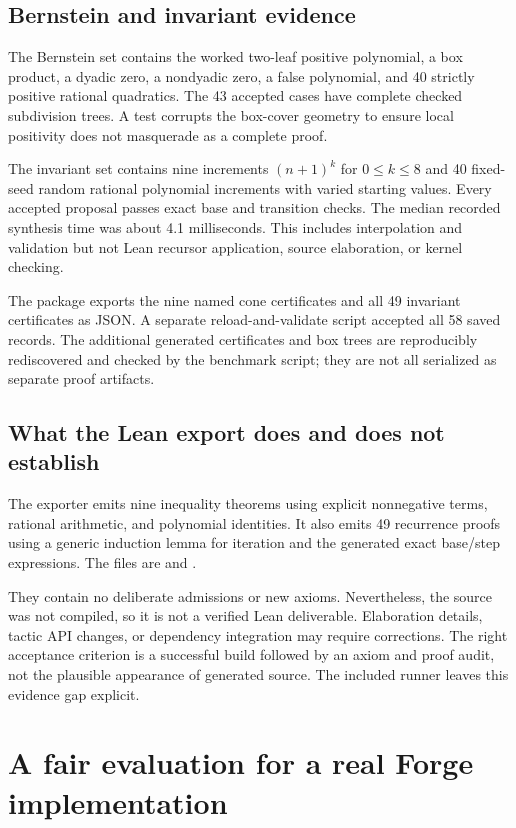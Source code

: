 \documentclass[11pt,a4paper]{article}
\begin{document}
\subsection{Bernstein and invariant evidence}

The Bernstein set contains the worked two-leaf positive polynomial, a box
product, a dyadic zero, a nondyadic zero, a false polynomial, and 40 strictly
positive rational quadratics. The 43 accepted cases have complete checked
subdivision trees. A test corrupts the box-cover geometry to ensure local
positivity does not masquerade as a complete proof.

The invariant set contains nine increments $(n+1)^k$ for $0\leq k\leq8$ and
40 fixed-seed random rational polynomial increments with varied starting
values. Every accepted proposal passes exact base and transition checks.
The median recorded synthesis time was about 4.1 milliseconds. This includes
interpolation and validation but not Lean recursor application, source
elaboration, or kernel checking.

The package exports the nine named cone certificates and all 49 invariant
certificates as JSON. A separate reload-and-validate script accepted all 58
saved records. The additional generated certificates and box trees are
reproducibly rediscovered and checked by the benchmark script; they are not
all serialized as separate proof artifacts.

\subsection{What the Lean export does and does not establish}

The exporter emits nine inequality theorems using explicit nonnegative terms,
rational arithmetic, and polynomial identities. It also emits 49 recurrence
proofs using a generic induction lemma for iteration and the generated exact
base/step expressions. The files are  and
.

They contain no deliberate admissions or new axioms. Nevertheless, the source
was not compiled, so it is not a verified Lean deliverable. Elaboration details,
tactic API changes, or dependency integration may require corrections. The
right acceptance criterion is a successful build followed by an axiom and
proof audit, not the plausible appearance of generated source. The included
runner leaves this evidence gap explicit.

\section{A fair evaluation for a real Forge implementation}
\end{document}
